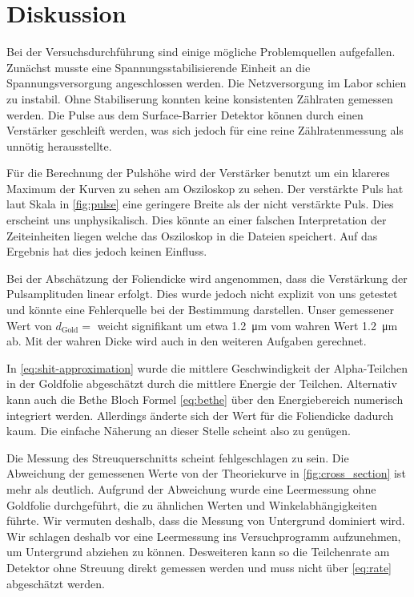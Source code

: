 \section{Diskussion}

Bei der Versuchsdurchführung sind einige mögliche Problemquellen aufgefallen.
Zunächst musste eine Spannungsstabilisierende Einheit an die Spannungsversorgung angeschlossen werden.
Die Netzversorgung im Labor schien zu instabil. Ohne Stabiliserung konnten keine konsistenten Zählraten gemessen werden.
Die Pulse aus dem Surface-Barrier Detektor können durch einen Verstärker geschleift werden, was sich jedoch für eine reine Zählratenmessung
als unnötig herausstellte.

Für die Berechnung der Pulshöhe wird der Verstärker benutzt um ein klareres Maximum der Kurven zu sehen am Osziloskop zu sehen.
Der verstärkte Puls hat laut Skala in \autoref{fig:pulse} eine geringere Breite als der nicht verstärkte Puls.
Dies erscheint uns unphysikalisch. Dies könnte an einer falschen Interpretation der Zeiteinheiten liegen welche das Osziloskop in die Dateien speichert.
Auf das Ergebnis hat dies jedoch keinen Einfluss.

Bei der Abschätzung der Foliendicke wird angenommen, dass die Verstärkung der Pulsamplituden linear erfolgt.
Dies wurde jedoch nicht explizit von uns getestet und könnte eine Fehlerquelle bei der Bestimmung darstellen.
Unser gemessener Wert von $d_\text{Gold} = $ weicht signifikant um etwa \SI{1.2}{\micro\meter} vom wahren Wert \SI{1.2}{\micro\meter} ab.
Mit der wahren Dicke wird auch in den weiteren Aufgaben gerechnet.

In \eqref{eq:shit-approximation} wurde die mittlere Geschwindigkeit der Alpha-Teilchen in der Goldfolie abgeschätzt durch die mittlere Energie der Teilchen.
Alternativ kann auch die Bethe Bloch Formel \eqref{eq:bethe} über den Energiebereich numerisch integriert werden.
Allerdings änderte sich der Wert für die Foliendicke dadurch kaum. Die einfache Näherung an dieser Stelle scheint also zu genügen.


Die Messung des Streuquerschnitts scheint fehlgeschlagen zu sein. Die Abweichung der gemessenen Werte von der Theoriekurve in \autoref{fig:cross_section} ist mehr als deutlich.
Aufgrund der Abweichung wurde eine Leermessung ohne Goldfolie durchgeführt, die zu ähnlichen Werten und Winkelabhängigkeiten führte.
Wir vermuten deshalb, dass  die Messung von Untergrund dominiert wird.
Wir schlagen deshalb vor eine Leermessung ins Versuchprogramm aufzunehmen, um Untergrund abziehen zu können.
Desweiteren kann so die Teilchenrate am Detektor ohne Streuung direkt gemessen werden und muss nicht über \eqref{eq:rate} abgeschätzt werden.
